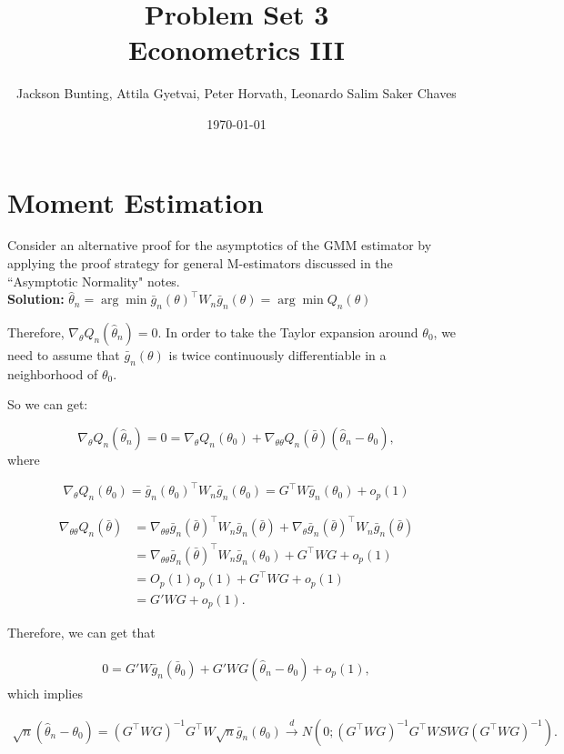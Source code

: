 \documentclass[11pt,letterpaper]{article}                  %
\title{Problem Set 3 \\ \medskip \Large{Econometrics III}}
\author{\Large Jackson Bunting, Attila Gyetvai, Peter Horvath, Leonardo Salim Saker Chaves}
\date{\today}
\begin{document}
\maketitle
\section{Moment Estimation}

\begin{problem} Consider an alternative proof for the asymptotics of the GMM estimator by applying the proof strategy for general M-estimators discussed in the ``Asymptotic Normality" notes. \\

\textbf{Solution:} $\hat{\theta}_n = \arg\min \bar{g}_n(\theta)^\intercal W_n \bar{g}_n(\theta) = \arg\min Q_n(\theta)$

Therefore, $\nabla_\theta Q_n(\hat{\theta}_n) = 0$. In order to take the Taylor expansion around $\theta_0$, we need to assume that $\bar{g}_n(\theta)$ is twice continuously differentiable in a neighborhood of $\theta_0$. 

So we can get:

\begin{equation*}
	\nabla_\theta Q_n(\hat{\theta}_n) = 0 = \nabla_\theta Q_n(\theta_0) +  \nabla_{\theta \theta} Q_n(\bar{\theta}) (\hat{\theta}_n - \theta_0),
\end{equation*} where

\begin{equation*}
\nabla_\theta Q_n(\theta_0) = \bar{g}_n(\theta_0)^\intercal W_n \bar{g}_n(\theta_0) = G^\intercal W \bar{g}_n(\theta_0) + o_p(1)
\end{equation*}

\begin{align*}
\nabla_{\theta \theta} Q_n(\bar{\theta})  & = \nabla_{\theta \theta} \bar{g}_n(\bar{\theta})^\intercal W_n\bar{g}_n(\bar{\theta}) +  \nabla_{\theta} 
\bar{g}_n(\bar{\theta})^\intercal W_n \bar{g}_n(\bar{\theta}) \\
& = \nabla_{\theta \theta} \bar{g}_n(\bar{\theta})^\intercal W_n\bar{g}_n(\theta_0) + G^\intercal W G + o_p(1) \\ 
& =O_p(1)o_p(1)+G^\intercal W G + o_p(1) \\
& = G'WG+o_p(1). 
\end{align*}

Therefore, we can get that 

\begin{align*}
	0 = G' W \bar{g}_n(\bar{\theta}_0) + G' W G (\hat{\theta}_n - \theta_0)+o_p(1),
\end{align*}
which implies 

\begin{align*}
	\sqrt{n}(\hat{\theta}_n - \theta_0) = (G^\intercal W G)^{-1} G^\intercal W \sqrt{n} \bar{g}_n(\theta_0) \xrightarrow{d} N(0; (G^\intercal W G)^{-1} G^\intercal W S W G (G^\intercal W G)^{-1}).
\end{align*}

\end{problem}
\end{document}
